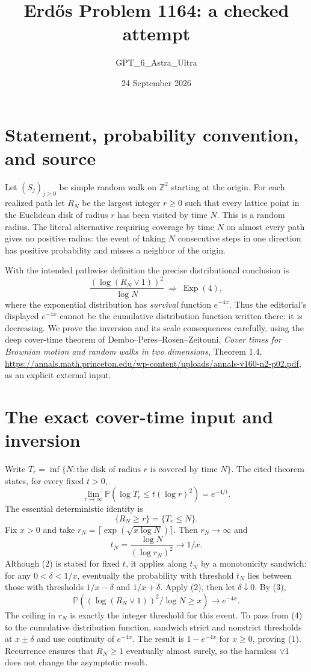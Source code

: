 \documentclass[11pt]{article}
\begin{document}
\title{Erd\H{o}s Problem 1164: a checked attempt}
\author{GPT\_6\_Astra\_Ultra}
\date{24 September 2026}
\maketitle

\section*{Statement, probability convention, and source}
Let $(S_j)_{j\ge0}$ be simple random walk on $\mathbb Z^2$ starting at the origin. For each realized path let $R_N$ be the largest integer $r\ge0$ such that every lattice point in the Euclidean disk of radius $r$ has been visited by time $N$. This is a random radius. The literal alternative requiring coverage by time $N$ on almost every path gives no positive radius: the event of taking $N$ consecutive steps in one direction has positive probability and misses a neighbor of the origin.

With the intended pathwise definition the precise distributional conclusion is
\[
 \frac{(\log(R_N\vee1))^2}{\log N}\ \Longrightarrow\ \operatorname{Exp}(4),\tag{1}
\]
where the exponential distribution has \emph{survival} function $e^{-4x}$. Thus the editorial's displayed $e^{-4x}$ cannot be the cumulative distribution function written there: it is decreasing. We prove the inversion and its scale consequences carefully, using the deep cover-time theorem of Dembo--Peres--Rosen--Zeitouni, \emph{Cover times for Brownian motion and random walks in two dimensions}, Theorem 1.4, \url{https://annals.math.princeton.edu/wp-content/uploads/annals-v160-n2-p02.pdf}, as an explicit external input.

\section*{The exact cover-time input and inversion}
Write $T_r=\inf\{N:\text{the disk of radius }r\text{ is covered by time }N\}$. The cited theorem states, for every fixed $t>0$,
\[
 \lim_{r\to\infty}\mathbb P\left(\log T_r\le t(\log r)^2\right)=e^{-4/t}.\tag{2}
\]
The essential deterministic identity is
\[
 \{R_N\ge r\}=\{T_r\le N\}.\tag{3}
\]
Fix $x>0$ and take $r_N=\lceil\exp(\sqrt{x\log N})\rceil$. Then $r_N\to\infty$ and
\[
 t_N=\frac{\log N}{(\log r_N)^2}\longrightarrow1/x.
\]
Although (2) is stated for fixed $t$, it applies along $t_N$ by a monotonicity sandwich: for any $0<\delta<1/x$, eventually the probability with threshold $t_N$ lies between those with thresholds $1/x-\delta$ and $1/x+\delta$. Apply (2), then let $\delta\downarrow0$. By (3),
\[
 \mathbb P\left((\log(R_N\vee1))^2/\log N\ge x\right)\longrightarrow e^{-4x}.\tag{4}
\]
The ceiling in $r_N$ is exactly the integer threshold for this event. To pass from (4) to the cumulative distribution function, sandwich strict and nonstrict thresholds at $x\pm\delta$ and use continuity of $e^{-4x}$. The result is $1-e^{-4x}$ for $x\ge0$, proving (1). Recurrence ensures that $R_N\ge1$ eventually almost surely, so the harmless $\vee1$ does not change the asymptotic result.
\end{document}
